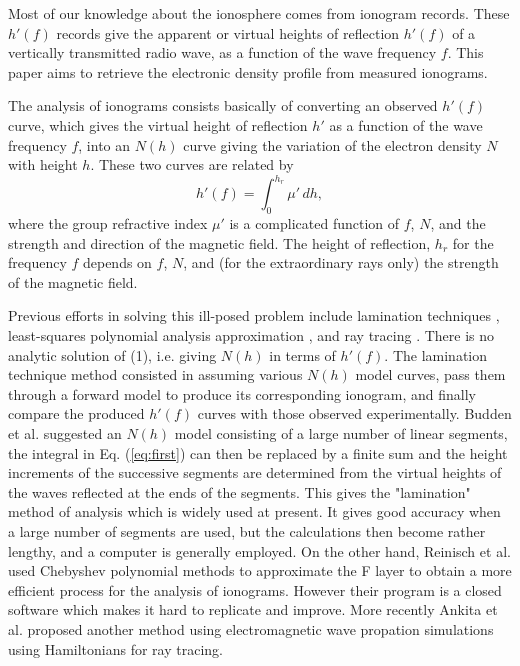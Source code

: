 \documentclass[aps,twocolumn,prb,showpacs,superscriptaddress]{revtex4-2}
\newcommand{\+}{\dagger}
\begin{document}
Most of our knowledge about the ionosphere comes from ionogram records. These $h'(f)$ records give the apparent or virtual heights of reflection $h'(f)$ of a vertically transmitted radio wave, as a function of the wave frequency $f$. This paper aims to retrieve the electronic density profile from measured ionograms.

The analysis of ionograms consists basically of converting an observed $h'(f)$ curve, which gives the virtual height of reflection $h'$ as a function of the wave frequency $f$, into an $N(h)$ curve giving the variation of the electron density $N$ with height $h$. These two curves are related by
\begin{equation}
h'(f) = \int_0^{h_r} \mu' \, dh,
\label{eq:first}
\end{equation}
where the group refractive index $\mu'$ is a complicated function of $f$, $N$, and the strength and direction of the magnetic field. The height of reflection, $h_r$ for the frequency $f$ depends on $f$, $N$, and (for the extraordinary rays only) the strength of the magnetic field.

Previous efforts in solving this ill-posed problem include lamination techniques \cite{reilly1989}, least-squares polynomial analysis approximation \cite{reinisch1983,titheridge1967}, and ray tracing \cite{manjrekar2023}. There is no analytic solution of (1), i.e. giving $N(h)$ in terms of $h'(f)$. The lamination technique method consisted in assuming various $N(h)$ model curves, pass them through a forward model to produce its corresponding ionogram, and finally compare the produced $h'(f)$ curves with those observed experimentally. Budden et al. \cite{budden1955} suggested an $N(h)$ model consisting of a large number of linear segments, the integral in Eq. (\ref{eq:first}) can then be replaced by a finite sum and the height increments of the successive segments are determined from the virtual heights of the waves reflected at the ends of the segments. This gives the "lamination" method of analysis which is widely used at present. It gives good accuracy when a large number of segments are used, but the calculations then become rather lengthy, and a computer is generally employed. On the other hand, Reinisch et al. used Chebyshev polynomial methods to approximate the F layer to obtain a more efficient process for the analysis of ionograms. However their program is a closed software which makes it hard to replicate and improve. More recently Ankita et al. proposed another method using electromagnetic wave propation simulations using Hamiltonians for ray tracing.
\end{document}
